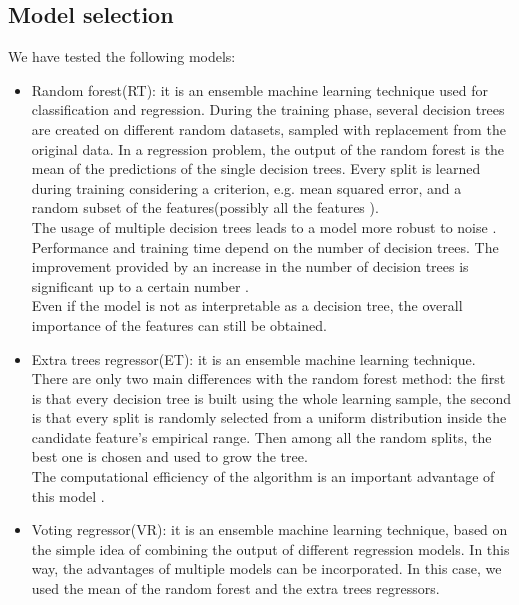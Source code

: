 \documentclass[conference]{IEEEtran}
\begin{document}
\subsection{Model selection}
We have tested the following models:
\begin{itemize}
    \item Random forest(RT): it is an ensemble machine learning technique used for classification and regression. During the training phase, several decision trees are created on different random datasets, sampled with replacement from the original data. In a regression problem, the output of the random forest is the mean of the predictions of the single decision trees. Every split is learned during training considering a criterion, e.g. mean squared error, and a random subset of the features(possibly all the features\cite{randomForest} \cite{extraTree}).\\
The usage of multiple decision trees leads to a model more robust to noise \cite{randomForest}. Performance and training time depend on the number of decision trees. The improvement provided by an increase in the number of decision trees is significant up to a certain number \cite{limitNumTrees}.\\
Even if the model is not as interpretable as a decision tree, the overall importance of the features can still be obtained.
\item Extra trees regressor(ET): it is an ensemble machine learning technique. There are only two main differences with the random forest method: the first is that every decision tree is built using the whole learning sample, the second is that every split is randomly selected from a uniform distribution inside the candidate feature's empirical range. Then among all the random splits, the best one is chosen and used to grow the tree. \\
The computational efficiency of the algorithm is an important advantage of this model \cite{extraTree}.
\item Voting regressor(VR): it is an ensemble machine learning technique, based on the simple idea of combining the output of different regression models. In this way, the advantages of multiple models can be incorporated. In this case, we used the mean of the random forest and the extra trees regressors. %
\end{itemize}
\end{document}
